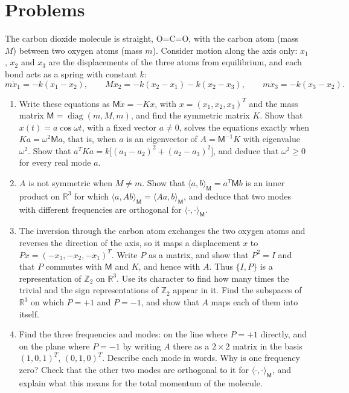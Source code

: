 \documentclass[11pt,a4paper]{article}
\newcommand{\Z}{\mathbb{Z}}
\newcommand{\R}{\mathbb{R}}
\DeclareMathOperator{\diag}{diag}
\newcommand{\MM}{\mathsf{M}}
\newcommand{\problem}[1]{\par\vspace{0.9em}\noindent{\bfseries #1}\par\vspace{0.1em}}
\begin{document}
\section*{\large Problems}

\problem{1. The vibrations of carbon dioxide}
The carbon dioxide molecule is straight, O=C=O, with the carbon atom (mass $M$) between two oxygen atoms (mass $m$). Consider motion along the axis only: $x_1$, $x_2$ and $x_3$ are the displacements of the three atoms from equilibrium, and each bond acts as a spring with constant $k$:
\[
  m\ddot x_1 = -k(x_1 - x_2), \qquad M\ddot x_2 = -k(x_2 - x_1) - k(x_2 - x_3), \qquad m\ddot x_3 = -k(x_3 - x_2).
\]
\begin{enumerate}
  \item Write these equations as $\MM\ddot x = -Kx$, with $x = (x_1, x_2, x_3)^T$ and the mass matrix $\MM = \diag(m, M, m)$, and find the symmetric matrix $K$. Show that $x(t) = a\cos\omega t$, with a fixed vector $a \ne 0$, solves the equations exactly when $Ka = \omega^2\MM a$, that is, when $a$ is an eigenvector of $A = \MM^{-1}K$ with eigenvalue $\omega^2$. Show that $a^T K a = k\bigl[(a_1 - a_2)^2 + (a_2 - a_3)^2\bigr]$, and deduce that $\omega^2 \ge 0$ for every real mode $a$.
  \item $A$ is not symmetric when $M \ne m$. Show that $\langle a, b\rangle_\MM = a^T \MM b$ is an inner product on $\R^3$ for which $\langle a, Ab\rangle_\MM = \langle Aa, b\rangle_\MM$, and deduce that two modes with different frequencies are orthogonal for $\langle\cdot, \cdot\rangle_\MM$.
  \item The inversion through the carbon atom exchanges the two oxygen atoms and reverses the direction of the axis, so it maps a displacement $x$ to $Px = (-x_3, -x_2, -x_1)^T$. Write $P$ as a matrix, and show that $P^2 = I$ and that $P$ commutes with $\MM$ and $K$, and hence with $A$. Thus $\{I, P\}$ is a representation of $\Z_2$ on $\R^3$. Use its character to find how many times the trivial and the sign representations of $\Z_2$ appear in it. Find the subspaces of $\R^3$ on which $P = +1$ and $P = -1$, and show that $A$ maps each of them into itself.
  \item Find the three frequencies and modes: on the line where $P = +1$ directly, and on the plane where $P = -1$ by writing $A$ there as a $2 \times 2$ matrix in the basis $(1, 0, 1)^T$, $(0, 1, 0)^T$. Describe each mode in words. Why is one frequency zero? Check that the other two modes are orthogonal to it for $\langle\cdot, \cdot\rangle_\MM$, and explain what this means for the total momentum of the molecule.

\end{enumerate}
\end{document}
